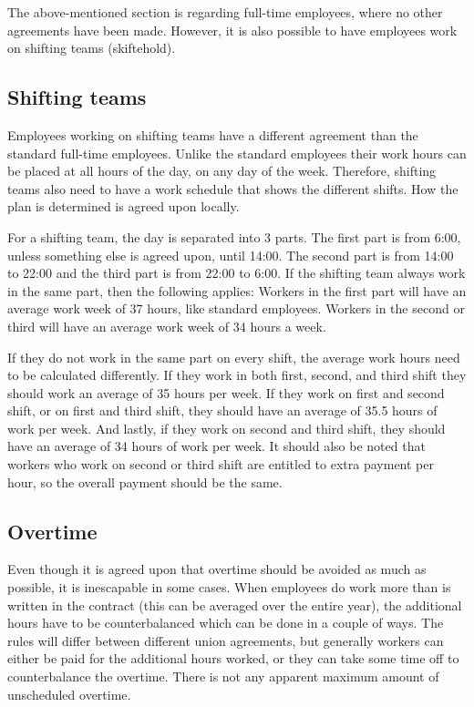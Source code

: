 The above-mentioned section is regarding full-time employees, where no other agreements have been made. However, it is also possible to have employees work on shifting teams (skiftehold).  \parencite{industriens_overenskomst}

\subsection{Shifting teams}
Employees working on shifting teams have a different agreement than the standard full-time employees. Unlike the standard employees their work hours can be placed at all hours of the day, on any day of the week. Therefore, shifting teams also need to have a work schedule that shows the different shifts. How the plan is determined is agreed upon locally.

For a shifting team, the day is separated into 3 parts. The first part is from 6:00, unless something else is agreed upon, until 14:00. The second part is from 14:00 to 22:00 and the third part is from 22:00 to 6:00. If the shifting team always work in the same part, then the following applies:
Workers in the first part will have an average work week of 37 hours, like standard employees.
Workers in the second or third will have an average work week of 34 hours a week.

If they do not work in the same part on every shift, the average work hours need to be calculated differently. If they work in both first, second, and third shift they should work an average of 35 hours per week. If they work on first and second shift, or on first and third shift, they should have an average of 35.5 hours of work per week. And lastly, if they work on second and third shift, they should have an average of 34 hours of work per week.
It should also be noted that workers who work on second or third shift are entitled to extra payment per hour, so the overall payment should be the same.

\subsection{Overtime}
Even though it is agreed upon that overtime should be avoided as much as possible, it is inescapable in some cases. When employees do work more than is written in the contract (this can be averaged over the entire year), the additional hours have to be counterbalanced which can be done in a couple of ways. The rules will differ between different union agreements, but generally workers can either be paid for the additional hours worked, or they can take some time off to counterbalance the overtime. There is not any apparent maximum amount of unscheduled overtime.

